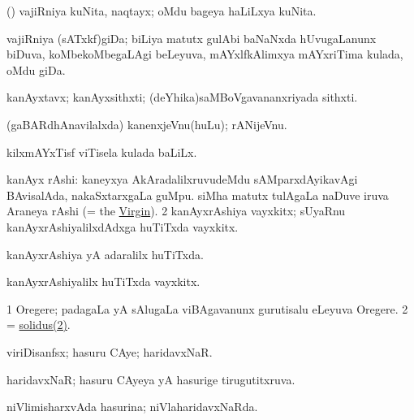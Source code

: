 \bentry
{}
\gl{\nA}
\expl{}
\bmng
 (\ame) vajiRniya kuNita, naqtayx; oMdu bageya haLiLxya kuNita. 
\emng
\eentry

\bentry 
{}
\gl{\nA}
\expl{}
\bmng
 vajiRniya (sATxkf)giDa; biLiya matutx gulAbi baNaNxda hUvugaLanunx biDuva, koMbekoMbegaLAgi beLeyuva, mAYxlfkAlimxya mAYxriTima kulada, oMdu giDa. 
\emng
\eentry

\bentry 
{} 
\gl{\nA}
\expl{}
\bmng
 kanAyxtavx; kanAyxsithxti; (deYhika)saMBoVgavananxriyada sithxti. 
\emng
\eentry

\bentry 
{}
\gl{\nA}
\expl{}
\bmng
 (gaBARdhAnavilalxda) kanenxjeVnu(huLu); rANijeVnu. 
\emng
\eentry

\bentry
{}
\gl{\nA}
\expl{}
\bmng
 kilxmAYxTisf viTisela kulada baLiLx. 
\emng
\eentry

\bentry
{} 
\gl{\nA}
\bmng
\bnum
{} kanAyx rAshi: 
\banum
{} kaneyxya AkAradalilxruvudeMdu sAMparxdAyikavAgi BAvisalAda, nakaSxtarxgaLa guMpu. 
 siMha matutx tulAgaLa naDuve iruva Araneya rAshi (= the \hyperlink{virgin(2)}{Virgin}). 
\eanum
\numie
\num{2} kanAyxrAshiya vayxkitx; sUyaRnu kanAyxrAshiyalilxdAdxga huTiTxda vayxkitx. 
\enum
\emng
\eentry

\bentry
{} 
\gl{\gu}
\expl{}
\bmng
 kanAyxrAshiya yA adaralilx huTiTxda. 
\emng
\eentry

\bentry
{} 
\gl{\nA}
\expl{}
\bmng
 kanAyxrAshiyalilx huTiTxda vayxkitx. 
\emng
\eentry

\bentry
{} 
\gl{\nA}
\expl{}
\bmng
\bnum
\num{1} Oregere; padagaLa yA sAlugaLa viBAgavanunx gurutisalu eLeyuva Oregere. 
\num{2} = \hyperref{kandict_s.pdf}{S}{solidus(2)}{solidus(2)}. 
\enum
\emng
\eentry

\bentry
{} 
\gl{\nA}
\expl{}
\bmng
 viriDisanfsx; hasuru CAye; haridavxNaR. 
\emng
\eentry

\bentry
{} 
\gl{\gu}
\expl{}
\bmng
 haridavxNaR; hasuru CAyeya yA hasurige tirugutitxruva. 
\emng
\eentry

\bentry 
{} 
\gl{\gu}
\expl{}
\bmng
 niVlimisharxvAda hasurina; niVlaharidavxNaRda. 
\emng
\eentry

